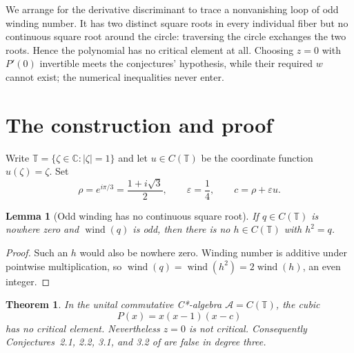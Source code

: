 \documentclass[11pt]{article}
\newtheorem{theorem}{Theorem}
\newtheorem{lemma}{Lemma}
\newcommand{\A}{\mathcal A}
\newcommand{\T}{\mathbb T}
\newcommand{\wind}{\operatorname{wind}}
\begin{document}
We arrange for the derivative discriminant to trace a nonvanishing loop of
odd winding number.  It has two distinct square roots in every individual
fiber but no continuous square root around the circle: traversing the circle
exchanges the two roots.  Hence the polynomial has no critical element at
all.  Choosing $z=0$ with $P'(0)$ invertible meets the conjectures' hypothesis,
while their required $w$ cannot exist; the numerical inequalities never enter.

\section{The construction and proof}

Write $\T=\{\zeta\in\mathbb C:|\zeta|=1\}$ and let
$u\in C(\T)$ be the coordinate function $u(\zeta)=\zeta$.  Set
\[
 \rho=e^{i\pi/3}=\frac{1+i\sqrt3}{2},\qquad
 \varepsilon=\frac14,\qquad c=\rho+\varepsilon u.
\]

\begin{lemma}[Odd winding has no continuous square root]\label{lem:winding}
If $q\in C(\T)$ is nowhere zero and $\wind(q)$ is odd, then there is no
$h\in C(\T)$ with $h^2=q$.
\end{lemma}

\begin{proof}
Such an $h$ would also be nowhere zero.  Winding number is additive under
pointwise multiplication, so
$\wind(q)=\wind(h^2)=2\wind(h)$, an even integer.
\end{proof}

\begin{theorem}\label{thm:counterexample}
In the unital commutative C*-algebra $\A=C(\T)$, the cubic
\[
                    P(x)=x(x-1)(x-c)
\]
has no critical element.  Nevertheless $z=0$ is not critical.  Consequently
Conjectures~2.1, 2.2, 3.1, and 3.2 of \cite{Krishna} are false in degree
three.
\end{theorem}
\end{document}
